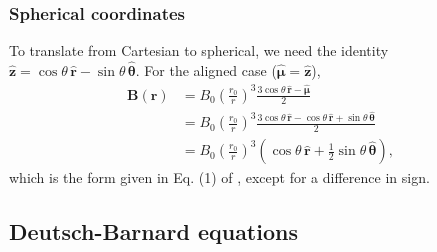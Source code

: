 \documentclass{book}
\newcommand{\unitvec}[1]{\hat{\bm{#1}}}
\begin{document}
\subsubsection{Spherical coordinates}

To translate from Cartesian to spherical, we need the identity $\unitvec{z} = \cos\theta \,\unitvec{r} - \sin\theta\,\unitvec{\theta}$.
For the aligned case ($\unitvec{\mu} = \unitvec{z}$),
\begin{equation}
\begin{aligned}
    \bm{B}(\bm{r})
        &= B_0\left(\frac{r_0}{r}\right)^3\frac{3\cos\theta\,\unitvec{r} - \unitvec{\mu}}{2} \\
        &= B_0\left(\frac{r_0}{r}\right)^3\frac{3\cos\theta\,\unitvec{r} - \cos\theta \,\unitvec{r} + \sin\theta\,\unitvec{\theta}}{2} \\
        &= B_0\left(\frac{r_0}{r}\right)^3\left(\cos\theta\,\unitvec{r} + \frac12 \sin\theta\,\unitvec{\theta}\right),
\end{aligned}
\end{equation}
which is the form given in Eq. (1) of \citet{Davis1947}, except for a difference in sign.

\subsection{Deutsch-Barnard equations}
\end{document}
